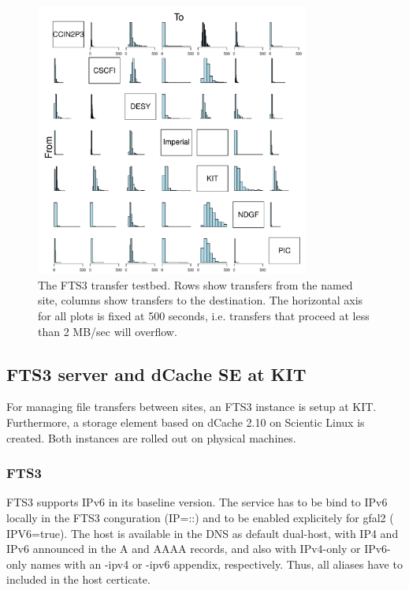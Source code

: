 \begin{figure}[h]
 \centering
   \includegraphics[width=0.8\textwidth]{fts3-mesh.pdf}
       \caption{The FTS3 transfer testbed. Rows show transfers from the named site, columns show transfers to the destination. The horizontal axis for all plots is fixed at 500 seconds, i.e. transfers that proceed at less than 2 MB/sec will overflow.}
 \label{fig:fts3-mesh}
\end{figure}


\subsection{FTS3 server and dCache SE at KIT}
For managing file transfers between sites, an FTS3 instance is setup at KIT. Furthermore, a storage element based on dCache 2.10 on Scientic Linux is created. Both instances are rolled out on physical machines.

\subsubsection{FTS3}
FTS3 supports IPv6 in its baseline version. The service has to be bind to IPv6 locally in the FTS3 conguration (IP=::) and to be enabled explicitely for gfal2 ( IPV6=true). The host is available in the DNS as default dual-host, with IP4 and IPv6 announced in the A and AAAA records, and also with IPv4-only or IPv6-only names with an -ipv4 or -ipv6 appendix, respectively. Thus, all aliases have to included in the host certicate.

